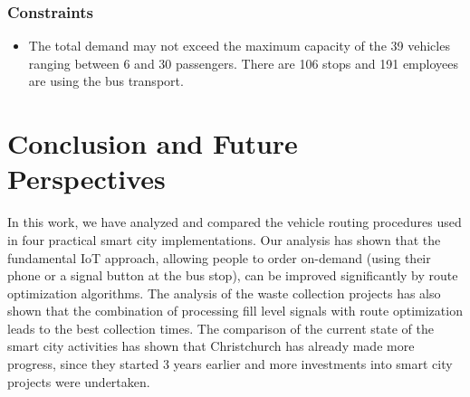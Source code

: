 \documentclass[10pt]{article}
\begin{document}
\subsubsection*{Constraints}

\begin{itemize}
\item The total demand may not exceed the maximum capacity of the 39 vehicles ranging between 6 
and 30 passengers. There are 106 stops and 191 employees are using the bus transport.

\end{itemize}










\section{Conclusion and Future Perspectives}
\label{sec:concl}

In this work, we have analyzed and compared the vehicle routing procedures used in four practical 
smart city implementations. Our analysis has shown that the fundamental IoT approach, allowing
people to order on-demand (using their phone or a signal button at the bus stop), can be improved 
significantly by route optimization algorithms. The analysis of the waste collection projects has
also shown that the combination of processing fill level signals with route optimization leads
to the best collection times. The comparison of the current state of the smart city activities
has shown that Christchurch has already made more progress, since they started 3 years earlier
and more investments into smart city projects were undertaken.
\end{document}
